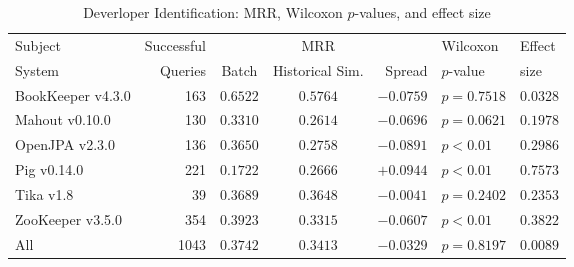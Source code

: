 \begin{table}[t]
\centering
\caption{Deverloper Identification: MRR, Wilcoxon $p$-values, and effect size}
\begin{tabular}{l|r|ccr|ll}
\toprule
Subject & Successful &    & MRR &        & Wilcoxon  & Effect \\
System  & Queries    & Batch & Historical Sim.  & Spread & $p$-value & size \\
\midrule
BookKeeper v4.3.0 & 163 & $\bm{0.6522}$ & $0.5764$ & $-0.0759$ & $p = 0.7518$ & $0.0328$ \\
Mahout v0.10.0 & 130 & $\bm{0.3310}$ & $0.2614$ & $-0.0696$ & $p = 0.0621$ & $0.1978$ \\
OpenJPA v2.3.0 & 136 & $\bm{0.3650}$ & $0.2758$ & $-0.0891$ & $p < 0.01$ & $0.2986$ \\
Pig v0.14.0 & 221 & $0.1722$ & $\bm{0.2666}$ & $+0.0944$ & $p < 0.01$ & $0.7573$ \\
Tika v1.8 & 39 & $\bm{0.3689}$ & $0.3648$ & $-0.0041$ & $p = 0.2402$ & $0.2353$ \\
ZooKeeper v3.5.0 & 354 & $\bm{0.3923}$ & $0.3315$ & $-0.0607$ & $p < 0.01$ & $0.3822$ \\
\midrule
All & 1043 & $\bm{0.3742}$ & $0.3413$ & $-0.0329$ & $p = 0.8197$ & $0.0089$ \\
\bottomrule
\end{tabular}
\label{table:triage_rq2}
\end{table}
